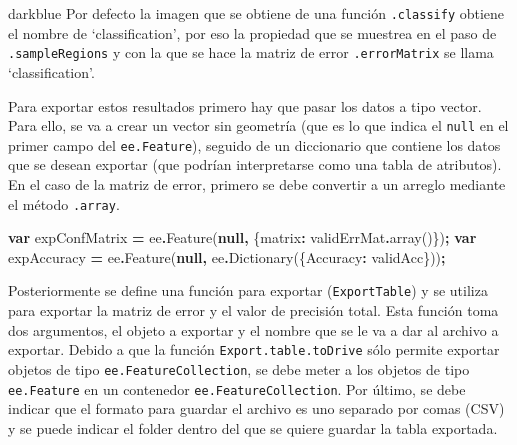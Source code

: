 \documentclass[
  12pt,
  letterpaper,
  twoside]{book}
\newenvironment{Shaded}{\begin{snugshade}}{\end{snugshade}}
\newcommand{\DataTypeTok}[1]{\textcolor[rgb]{0.13,0.29,0.53}{#1}}
\newcommand{\FunctionTok}[1]{\textcolor[rgb]{0.00,0.00,0.00}{#1}}
\newcommand{\KeywordTok}[1]{\textcolor[rgb]{0.13,0.29,0.53}{\textbf{#1}}}
\newcommand{\NormalTok}[1]{#1}
\newcommand{\OperatorTok}[1]{\textcolor[rgb]{0.81,0.36,0.00}{\textbf{#1}}}
\begin{document}
\begin{bluebox2}

\begin{awesomeblock}{5pt}{\faLightbulb}{darkblue}
Por defecto la imagen que se obtiene de una función \texttt{.classify} obtiene el nombre de `classification', por eso la propiedad que se muestrea en el paso de \texttt{.sampleRegions} y con la que se hace la matriz de error \texttt{.errorMatrix} se llama `classification'.

\end{awesomeblock}

\end{bluebox2}

Para exportar estos resultados primero hay que pasar los datos a tipo vector. Para ello, se va a crear un vector sin geometría (que es lo que indica el \texttt{null} en el primer campo del \texttt{ee.Feature}), seguido de un diccionario que contiene los datos que se desean exportar (que podrían interpretarse como una tabla de atributos). En el caso de la matriz de error, primero se debe convertir a un arreglo mediante el método \texttt{.array}.

\begin{Shaded}
\begin{Highlighting}[]
\KeywordTok{var}\NormalTok{ expConfMatrix }\OperatorTok{=}\NormalTok{  ee}\OperatorTok{.}\FunctionTok{Feature}\NormalTok{(}\KeywordTok{null}\OperatorTok{,}\NormalTok{ \{}\DataTypeTok{matrix}\OperatorTok{:}\NormalTok{ validErrMat}\OperatorTok{.}\FunctionTok{array}\NormalTok{()\})}\OperatorTok{;}
\KeywordTok{var}\NormalTok{ expAccuracy }\OperatorTok{=}\NormalTok{ ee}\OperatorTok{.}\FunctionTok{Feature}\NormalTok{(}\KeywordTok{null}\OperatorTok{,}\NormalTok{ ee}\OperatorTok{.}\FunctionTok{Dictionary}\NormalTok{(\{}\DataTypeTok{Accuracy}\OperatorTok{:}\NormalTok{ validAcc\}))}\OperatorTok{;}
\end{Highlighting}
\end{Shaded}

Posteriormente se define una función para exportar (\texttt{ExportTable}) y se utiliza para exportar la matriz de error y el valor de precisión total. Esta función toma dos argumentos, el objeto a exportar y el nombre que se le va a dar al archivo a exportar. Debido a que la función \texttt{Export.table.toDrive} sólo permite exportar objetos de tipo \texttt{ee.FeatureCollection}, se debe meter a los objetos de tipo \texttt{ee.Feature} en un contenedor \texttt{ee.FeatureCollection}. Por último, se debe indicar que el formato para guardar el archivo es uno separado por comas (CSV) y se puede indicar el folder dentro del que se quiere guardar la tabla exportada.
\end{document}
